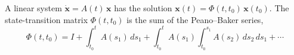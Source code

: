 A linear system $\dot{\mathbf x} = A(t)\,\mathbf x$ has the solution
$\mathbf x(t) = \Phi(t,t_0)\,\mathbf x(t_0)$.
The state-transition matrix $\Phi(t,t_0)$ is the sum of the Peano--Baker series,
\begin{equation}
  \Phi(t,t_0) = I + \int_{t_0}^{t} A(s_1)\,ds_1
  + \int_{t_0}^{t} A(s_1)\int_{t_0}^{s_1} A(s_2)\,ds_2\,ds_1 + \cdots
\end{equation}
